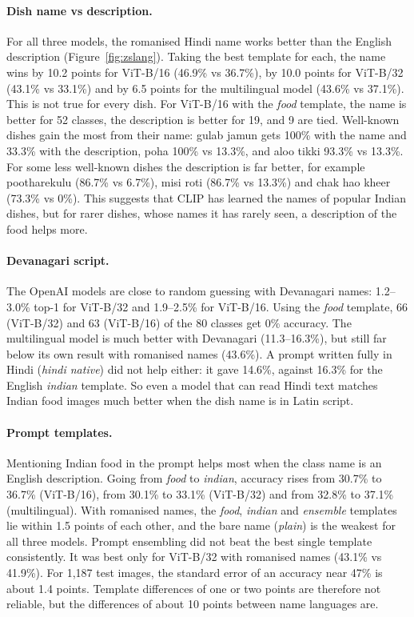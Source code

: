 \documentclass[twoside,a4paper,11pt]{article}
\begin{document}
\paragraph{Dish name vs description.} For all three models, the romanised Hindi name works better than the English
description (Figure~\ref{fig:zslang}). Taking the best template for each, the name wins by 10.2 points for ViT-B/16
(46.9\% vs 36.7\%), by 10.0 points for ViT-B/32 (43.1\% vs 33.1\%) and by 6.5 points for the multilingual model
(43.6\% vs 37.1\%). This is not true for every dish. For ViT-B/16 with the \emph{food} template, the name is better
for 52 classes, the description is better for 19, and 9 are tied. Well-known dishes gain the most from their name:
gulab jamun gets 100\% with the name and 33.3\% with the description, poha 100\% vs 13.3\%, and aloo tikki 93.3\% vs
13.3\%. For some less well-known dishes the description is far better, for example pootharekulu (86.7\% vs 6.7\%),
misi roti (86.7\% vs 13.3\%) and chak hao kheer (73.3\% vs 0\%). This suggests that CLIP has learned the names of
popular Indian dishes, but for rarer dishes, whose names it has rarely seen, a description of the food helps more.

\paragraph{Devanagari script.} The OpenAI models are close to random guessing with Devanagari names: 1.2--3.0\% top-1
for ViT-B/32 and 1.9--2.5\% for ViT-B/16. Using the \emph{food} template, 66 (ViT-B/32) and 63 (ViT-B/16) of the 80
classes get 0\% accuracy. The multilingual model is much better with Devanagari (11.3--16.3\%), but still far below
its own result with romanised names (43.6\%). A prompt written fully in Hindi (\emph{hindi native}) did not help
either: it gave 14.6\%, against 16.3\% for the English \emph{indian} template. So even a model that can read Hindi text
matches Indian food images much better when the dish name is in Latin script.

\paragraph{Prompt templates.} Mentioning Indian food in the prompt helps most when the class name is an English
description. Going from \emph{food} to \emph{indian}, accuracy rises from 30.7\% to 36.7\% (ViT-B/16), from 30.1\% to
33.1\% (ViT-B/32) and from 32.8\% to 37.1\% (multilingual). With romanised names, the \emph{food}, \emph{indian} and
\emph{ensemble} templates lie within 1.5 points of each other, and the bare name (\emph{plain}) is the weakest for all
three models. Prompt ensembling did not beat the best single template consistently. It was best only for ViT-B/32 with
romanised names (43.1\% vs 41.9\%). For 1{,}187 test images, the standard error of an accuracy near 47\% is about 1.4
points. Template differences of one or two points are therefore not reliable, but the differences of about 10 points
between name languages are.
\end{document}
